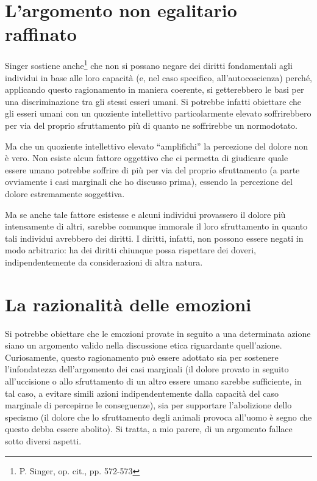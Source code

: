 \documentclass[a4paper,11pt,oneside,article]{memoir}
\begin{document}
\section{L'argomento non egalitario raffinato}

Singer sostiene anche\footnote{P. Singer, op. cit., pp. 572-573} che non si
possano negare dei diritti fondamentali agli individui in base alle loro
capacità (e, nel caso specifico, all'autocoscienza) perché, applicando questo
ragionamento in maniera coerente, si getterebbero le basi per una
discriminazione tra gli stessi esseri umani. Si potrebbe infatti obiettare che
gli esseri umani con un quoziente intellettivo particolarmente elevato
soffrirebbero per via del proprio sfruttamento più di quanto ne soffrirebbe un
normodotato.

Ma che un quoziente intellettivo elevato ``amplifichi'' la percezione del dolore
non è vero. Non esiste alcun fattore oggettivo che ci permetta di giudicare
quale essere umano potrebbe soffrire di più per via del proprio sfruttamento (a
parte ovviamente i casi marginali che ho discusso prima), essendo la percezione
del dolore estremamente soggettiva.

Ma se anche tale fattore esistesse e alcuni individui provassero il dolore più
intensamente di altri, sarebbe comunque immorale il loro sfruttamento in quanto
tali individui avrebbero dei diritti. I diritti, infatti, non possono essere
negati in modo arbitrario: ha dei diritti chiunque possa rispettare dei doveri,
indipendentemente da considerazioni di altra natura.

\section{La razionalità delle emozioni}

Si potrebbe obiettare che le emozioni provate in seguito a una determinata
azione siano un argomento valido nella discussione etica riguardante
quell'azione. Curiosamente, questo ragionamento può essere adottato sia per
sostenere l'infondatezza dell'argomento dei casi marginali (il dolore provato in
seguito all'uccisione o allo sfruttamento di un altro essere umano sarebbe
sufficiente, in tal caso, a evitare simili azioni indipendentemente dalla
capacità del caso marginale di percepirne le conseguenze), sia per supportare
l'abolizione dello specismo (il dolore che lo sfruttamento degli animali provoca
all'uomo è segno che questo debba essere abolito). Si tratta, a mio parere, di
un argomento fallace sotto diversi aspetti.
\end{document}
